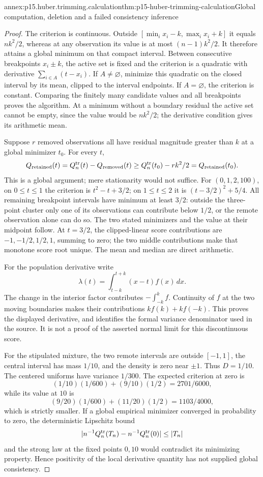 \begin{annexitem}{annex:p15.huber.trimming.calculation}{thm:p15-huber-trimming-calculation}{Global computation, deletion and a failed consistency inference}
\begin{proof}
The criterion is continuous. Outside
\([\min_i x_i-k,\max_i x_i+k]\) it equals \(nk^2/2\), whereas at
any observation its value is at most \((n-1)k^2/2\).
It therefore attains a global minimum on that compact interval.
Between consecutive breakpoints \(x_i\pm k\), the active set is fixed
and the criterion is a quadratic with derivative
\(\sum_{i\in A}(t-x_i)\). If \(A\ne\varnothing\), minimize this
quadratic on the closed interval by its mean, clipped to the
interval endpoints. If \(A=\varnothing\), the criterion is constant.
Comparing the finitely many candidate values and all breakpoints
proves the algorithm. At a minimum without a boundary residual
the active set cannot be empty, since the value would be \(nk^2/2\);
the derivative condition gives its arithmetic mean.

Suppose \(r\) removed observations all have residual magnitude
greater than \(k\) at a global minimizer \(t_0\). For every \(t\),
\[
 Q_{\rm retained}(t)
 =Q_n^{\rm tr}(t)-Q_{\rm removed}(t)
 \geq Q_n^{\rm tr}(t_0)-rk^2/2
 =Q_{\rm retained}(t_0).
\]
This is a global argument; mere stationarity would not suffice.
For \((0,1,2,100)\), on \(0\leq t\leq1\) the criterion is
\(t^2-t+3/2\); on \(1\leq t\leq2\) it is
\((t-3/2)^2+5/4\). All remaining breakpoint intervals have
minimum at least \(3/2\): outside the three-point cluster only
one of its observations can contribute below \(1/2\), or the
remote observation alone can do so. The two stated minimizers
and the value at their midpoint follow.
At \(t=3/2\), the clipped-linear score contributions are
\(-1,-1/2,1/2,1\), summing to zero; the two middle contributions
make that monotone score root unique. The mean and median are
direct arithmetic.

For the population derivative write
\[
 \lambda(t)=\int_{t-k}^{t+k}(x-t)f(x)\,dx.
\]
The change in the interior factor contributes
\(-\int_{-k}^kf\). Continuity of \(f\) at the two moving boundaries
makes their contributions \(k f(k)+k f(-k)\).
This proves the displayed derivative, and identifies the formal
variance denominator used in the source. It is not a proof of
the asserted normal limit for this discontinuous score.

For the stipulated mixture, the two remote intervals are outside
\([-1,1]\), the central interval has mass \(1/10\), and the density
is zero near \(\pm1\). Thus \(D=1/10\). The centered uniforms
have variance \(1/300\). The expected criterion at zero is
\[
 (1/10)(1/600)+(9/10)(1/2)=2701/6000,
\]
while its value at \(10\) is
\[
 (9/20)(1/600)+(11/20)(1/2)=1103/4000,
\]
which is strictly smaller.
If a global empirical minimizer converged in probability to zero,
the deterministic Lipschitz bound
\[
 |n^{-1}Q_n^{\rm tr}(T_n)-n^{-1}Q_n^{\rm tr}(0)|\leq |T_n|
\]
and the strong law at the fixed points \(0,10\) would contradict
its minimizing property. Hence positivity of the local derivative
quantity has not supplied global consistency.
\end{proof}
\end{annexitem}


